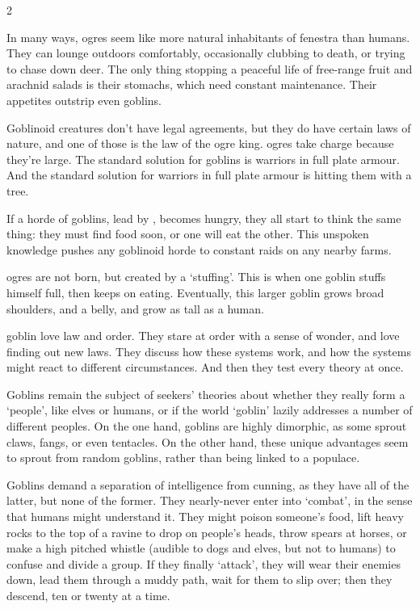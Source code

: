 \begin{multicols}{2}

\noindent
In many ways, \glspl{ogre} seem like more natural inhabitants of \gls{fenestra} than humans.
They can lounge outdoors comfortably, occasionally clubbing  to death, or trying to chase down deer.
The only thing stopping a peaceful life of free-range fruit and arachnid salads is their stomachs, which need constant maintenance.
Their appetites outstrip even goblins.

Goblinoid creatures don't have legal agreements, but they do have certain laws of nature, and one of those is the law of the \gls{ogre} king.
\Glspl{ogre} take charge because they're large.
The standard solution for goblins is warriors in full plate armour.
And the standard solution for warriors in full plate armour is  hitting them with a tree.

If a horde of goblins, lead by , becomes hungry, they all start to think the same thing: they must find food soon, or one will eat the other.
This unspoken knowledge pushes any goblinoid horde to constant raids on any nearby farms.

\Glspl{ogre} are not born, but created by a `stuffing'.
This is when one goblin stuffs himself full, then keeps on eating.
Eventually, this larger goblin grows broad shoulders, and a belly, and grow as tall as a human.

  {goblin}%
love law and order.
They stare at order with a sense of wonder, and love finding out new laws.
They discuss how these systems work, and how the systems might react to different circumstances.
And then they test every theory at once.

Goblins remain the subject of \glspl{seeker}' theories about whether they really form a `people', like elves or humans, or if the world `goblin' lazily addresses a number of different peoples.
On the one hand, goblins are highly dimorphic, as some sprout claws, fangs, or even tentacles.
On the other hand, these unique advantages seem to sprout from random goblins, rather than being linked to a populace.

Goblins demand a separation of intelligence from cunning, as they have all of the latter, but none of the former.
They nearly-never enter into `combat', in the sense that humans might understand it.
They might poison someone's food, lift heavy rocks to the top of a ravine to drop on people's heads, throw spears at horses, or make a high pitched whistle (audible to dogs and elves, but not to humans) to confuse and divide a group.
If they finally `attack', they will wear their enemies down, lead them through a muddy path, wait for them to slip over; then they descend, ten or twenty at a time.


\end{multicols}
